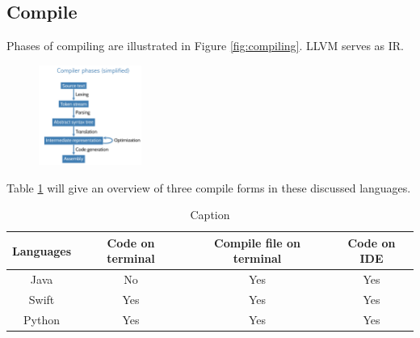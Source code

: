 \documentclass[12pt, a4paper]{report}
\begin{document}
	\subsection{Compile}
	Phases of compiling are illustrated in Figure \ref{fig:compiling}. LLVM serves as IR. 
	\begin{figure}[H]
	    \centering
	    \includegraphics[width=0.3\textwidth]{imgs/phases.png}
	    \caption{\citep{compile}}
	    \label{fig:my_label}
	\end{figure}
	Table \ref{tab:options} will give an overview of three compile forms in these discussed languages.
	\begin{table}[H]
	    \centering
	    \begin{tabular}{c|c|c|c}
	        \toprule
	         Languages & Code on terminal & Compile file on terminal & Code on IDE  \\
	         \hline
	         Java & No & Yes & Yes \\
	         \hline
	         Swift & Yes & Yes & Yes \\
	         \hline
	         Python & Yes & Yes & Yes \\
	         \bottomrule
	    \end{tabular}
	    \caption{Caption}
	    \label{tab:options}
	\end{table}
	
\end{document}
